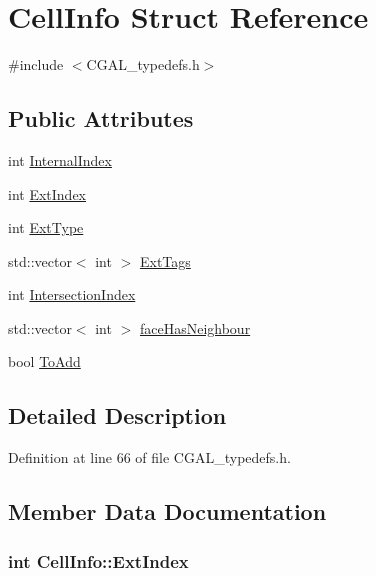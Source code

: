 \hypertarget{struct_cell_info}{}\section{Cell\+Info Struct Reference}
\label{struct_cell_info}


{\ttfamily \#include $<$C\+G\+A\+L\+\_\+typedefs.\+h$>$}

\subsection*{Public Attributes}
\begin{DoxyCompactItemize}
\item 
int \hyperlink{struct_cell_info_a23bf3cffc47b6430e60c5263022b684b}{Internal\+Index}
\item 
int \hyperlink{struct_cell_info_a89f6400e5e2bd717aaa615c6ff8e562a}{Ext\+Index}
\item 
int \hyperlink{struct_cell_info_a311c40e7871836b77267349a2c9fadc9}{Ext\+Type}
\item 
std\+::vector$<$ int $>$ \hyperlink{struct_cell_info_a152aa36b31e68fb44de2cbe1192cff3e}{Ext\+Tags}
\item 
int \hyperlink{struct_cell_info_a3e2aef19e88dfd6fd1b9ecdb78e0e425}{Intersection\+Index}
\item 
std\+::vector$<$ int $>$ \hyperlink{struct_cell_info_af5ee3a430a357a5680fed55e446519e3}{face\+Has\+Neighbour}
\item 
bool \hyperlink{struct_cell_info_aa1195689286f14121cad231892aa361e}{To\+Add}
\end{DoxyCompactItemize}


\subsection{Detailed Description}


Definition at line 66 of file C\+G\+A\+L\+\_\+typedefs.\+h.



\subsection{Member Data Documentation}
\hypertarget{struct_cell_info_a89f6400e5e2bd717aaa615c6ff8e562a}{}
\subsubsection[{Ext\+Index}]{\setlength{\rightskip}{0pt plus 5cm}int Cell\+Info\+::\+Ext\+Index}\label{struct_cell_info_a89f6400e5e2bd717aaa615c6ff8e562a}


